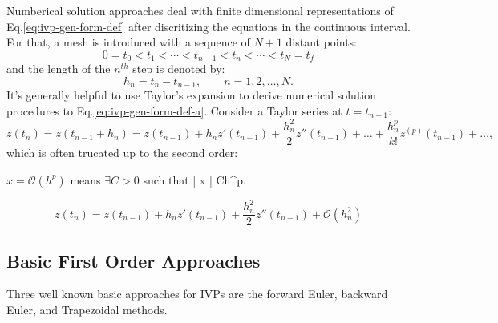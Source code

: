 \documentclass[letterpaper, 11pt]{article}
\begin{document}
Numberical solution approaches deal with finite dimensional representations of Eq.\eqref{eq:ivp-gen-form-def} after discritizing the equations in the continuous interval. For that, a
mesh is introduced with a sequence of $N+1$ distant points:
\begin{equation}
\label{eq:ivp-mesh-def}
0=t_{0}<t_{1}<\cdots<t_{n-1}<t_{n}<\cdots<t_{N}=t_{f}
\end{equation} 
and the length of the $n^{th}$ step is denoted by:
\begin{equation}
\label{eq:ivp-step-size-def}
h_{n} = t_{n} - t_{n-1}, \qquad n=1,2,\ldots,N.
\end{equation} 
It's generally helpful to use Taylor's expansion to derive numerical solution procedures to Eq.\eqref{eq:ivp-gen-form-def-a}. Consider a Taylor series at $t=t_{n-1}$: 
\begin{equation}
\label{eq:ivp-taylor-series-def}
z(t_{n}) = z(t_{n-1} + h_{n}) = z(t_{n-1}) + h_{n}z'(t_{n-1}) + \frac{h^{2}_{n}}{2}z''(t_{n-1}) + \ldots + \frac{h^{p}_{n}}{k!}z^{(p)}(t_{n-1}) + \ldots,
\end{equation}
which is often trucated up to the second order:
\begin{margintable}
\footnotesize
$x=\mathcal{O}(h^{p})$ means $\exists C>0$ such that \left | x \right | \leqslant Ch^{p}.
\end{margintable}
\begin{equation}
\label{eq:ivp-taylor-series-truc}
z(t_{n}) = z(t_{n-1}) + h_{n}z'(t_{n-1}) + \frac{h^{2}_{n}}{2}z''(t_{n-1}) + \mathcal{O}(h^{2}_{n})
\end{equation}
\subsection{Basic First Order Approaches}
\label{sec-1-1}
Three well known basic approaches for IVPs are the forward Euler, backward Euler, and Trapezoidal methods.
\end{document}
